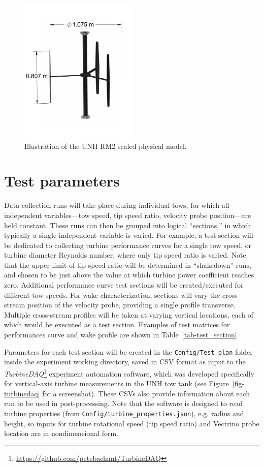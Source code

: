 \documentclass[12pt,letterpaper]{scrreprt}
\begin{document}
\begin{figure}[ht]
\centering
\includegraphics[width=0.5\textwidth]{Figures/turbine}
\caption{Illustration of the UNH RM2 scaled physical model.}
\label{fig-turbine_drawing}
\end{figure}


\section{Test parameters}

Data collection runs will take place during individual tows, for which all
independent variables---tow speed, tip speed ratio, velocity probe
position---are held constant. These runs can then be grouped into logical
``sections,'' in which typically a single independent variable is varied. For
example, a test section will be dedicated to collecting turbine performance
curves for a single tow speed, or turbine diameter Reynolds number, where only
tip speed ratio is varied. Note that the upper limit of tip speed ratio will be
determined in ``shakedown'' runs, and chosen to be just above the value at which
turbine power coefficient reaches zero. Additional performance curve test
sections will be created/executed for different tow speeds. For wake
characterization, sections will vary the cross-stream position of the velocity
probe, providing a single profile transverse. Multiple cross-stream profiles
will be taken at varying vertical locations, each of which would be executed as
a test section. Examples of test matrices for performances curve and wake
profile are shown in Table~\ref{tab-test_section}.

Parameters for each test section will be created in the \texttt{Config/Test
plan} folder inside the experiment working directory, saved in CSV format as
input to the
\textit{TurbineDAQ}\footnote{\url{https://github.com/petebachant/TurbineDAQ}}
experiment automation software, which was developed specifically for
vertical-axis turbine measurements in the UNH tow tank (see
Figure~\ref{fig-turbinedaq} for a screenshot). These CSVs also provide
information about each run to be used in post-processing. Note that the software
is designed to read turbine properties (from
\texttt{Config/turbine\_properties.json}), e.g. radius and height, so inputs for
turbine rotational speed (tip speed ratio) and Vectrino probe location are in
nondimensional form.
\end{document}
